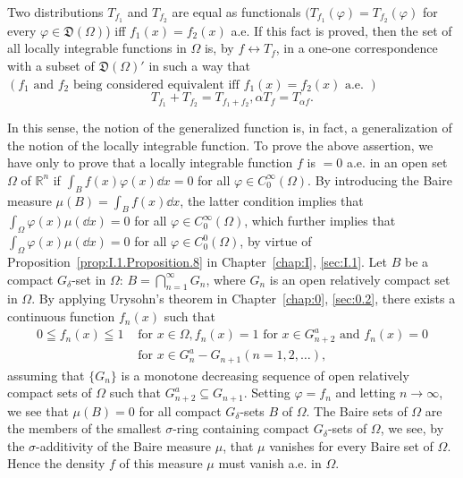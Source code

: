 \begin{remarku} Two distributions $T_{f_1}$ and $T_{f_2}$ are equal as functionals $(T_{f_1}(\varphi) = T_{f_2}(\varphi)$ for every $\varphi \in \mathfrak{D}(\Omega)$) iff $f_1(x) = f_2(x)$ a.e. If this fact is proved, then the set of all locally integrable functions in $\Omega$ is, by $f \leftrightarrow T_f$, in a one-one correspondence with a subset of $\mathfrak{D}(\Omega)'$ in such a way that $(f_1 \text{ and } f_2 \text{ being considered equivalent iff } f_1(x) = f_2(x) \text{ a.e. })$ 
\begin{equation}\tag{7'}\label{eq:I.8.7'}
T_ {f_{1}} + T_ {f_{2}} = T_ {f_{1} + f_{2}}, \alpha T_{f} = T_{\alpha f}.
\end{equation}
\end{remarku}

In this sense, the notion of the generalized function is, in fact, a generalization of the notion of the locally integrable function. To prove the above assertion, we have only to prove that a locally integrable function $f$ is $= 0$ a.e. in an open set $\Omega$ of $\mathbb{R}^{n}$ if $\int_{B} f(x) \varphi(x) \dd x = 0$ for all $\varphi \in C_0^\infty(\Omega)$. By introducing the Baire measure $\mu(B) = \int_{B} f(x) \dd x$, the latter condition implies that $\int_{\Omega} \varphi(x) \mu(\dd x) = 0$ for all $\varphi \in C_0^\infty(\Omega)$, which further implies that $\int_{\Omega} \varphi(x) \mu(\dd x) = 0$ for all $\varphi \in C_0^0(\Omega)$, by virtue of Proposition~\ref{prop:I.1.Proposition.8} in Chapter~\ref{chap:I}, \ref{sec:I.1}. Let $B$ be a compact $G_\delta$-set in $\Omega$: $B = \bigcap\limits_{n=1}^{\infty} G_n$, where $G_n$ is an open relatively compact set in $\Omega$. By applying Urysohn's theorem in Chapter~\ref{chap:0}, \ref{sec:0.2}, there exists a continuous function $f_n(x)$ such that 
\[
\begin{aligned} 0 \leqq f_{n} (x) \leqq 1 & \text{ for } x \in \Omega , f_{n} (x) = 1 \text{ for } x \in G_{n+2} ^{a} \text{ and } f_{n} (x) = 0 \\ & \text{ for } x \in G_{n} ^{a}- G_{n+1} (n = 1, 2, \dots), \end{aligned}
\]
assuming that $\{G_n\}$ is a monotone decreasing sequence of open relatively compact sets of $\Omega$ such that $G_{n+2}^a \subseteq G_{n+1}$. Setting $\varphi = f_n$ and letting $n \to \infty$, we see that $\mu(B) = 0$ for all compact $G_\delta$-sets $B$ of $\Omega$. The Baire sets of $\Omega$ are the members of the smallest $\sigma$-ring containing compact $G_\delta$-sets of $\Omega$, we see, by the $\sigma$-additivity of the Baire measure $\mu$, that $\mu$ vanishes for every Baire set of $\Omega$. Hence the density $f$ of this measure $\mu$ must vanish a.e. in $\Omega$. 

